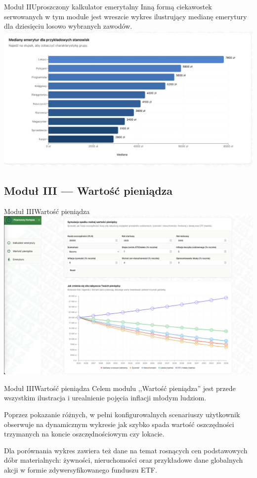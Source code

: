 \begin{frame}[t]{Moduł II}{Uproszczony kalkulator emerytalny}
Inną formą ciekawostek serwowanych w tym module jest wreszcie wykres ilustrujący
medianę emerytury dla dziesięciu losowo wybranych zawodów.
\\[2em]
\includegraphics[width=.8\textwidth]{img/module_2b_median_pensions}
\end{frame}

\subsection{Moduł III --- Wartość pieniądza}

\begin{frame}[t]{Moduł III}{Wartość pieniądza}
\includegraphics[width=.8\textwidth]{img/module_3_the_value_of_money}
\end{frame}

\begin{frame}[t]{Moduł III}{Wartość pieniądza}
Celem modulu ,,Wartość pieniądza'' jest przede wszystkim ilustracja
i urealnienie pojęcia inflacji młodym ludziom.

\pause Poprzez pokazanie różnych,
w pełni konfigurowalnych scenariuszy użytkownik obserwuje na dynamicznym
wykresie jak szybko spada wartość oszczędności trzymanych na koncie
oszczędnościowym czy lokacie.


\pause Dla porównania wykres zawiera też dane
na temat rosnących cen podstawowych dóbr materialnych: żywności, nieruchomości
oraz przykładowe dane globalnych akcji w formie zdywersyfikowanego funduszu ETF.
\end{frame}

